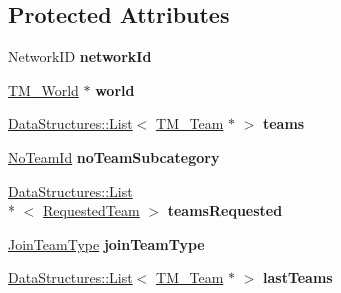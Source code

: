 \subsection*{Protected Attributes}
\begin{DoxyCompactItemize}
\item 
\hypertarget{class_rak_net_1_1_t_m___team_member_a7d1c66beeee534cbcfd6b041eaf6142e}{Network\-I\-D {\bfseries network\-Id}}\label{class_rak_net_1_1_t_m___team_member_a7d1c66beeee534cbcfd6b041eaf6142e}

\item 
\hypertarget{class_rak_net_1_1_t_m___team_member_a3e7be6d9b97a79a9a93cd23332a9604d}{\hyperlink{class_rak_net_1_1_t_m___world}{T\-M\-\_\-\-World} $\ast$ {\bfseries world}}\label{class_rak_net_1_1_t_m___team_member_a3e7be6d9b97a79a9a93cd23332a9604d}

\item 
\hypertarget{class_rak_net_1_1_t_m___team_member_a1578302b4ff5ebb3f23f3283be8cecd7}{\hyperlink{class_data_structures_1_1_list}{Data\-Structures\-::\-List}$<$ \hyperlink{class_rak_net_1_1_t_m___team}{T\-M\-\_\-\-Team} $\ast$ $>$ {\bfseries teams}}\label{class_rak_net_1_1_t_m___team_member_a1578302b4ff5ebb3f23f3283be8cecd7}

\item 
\hypertarget{class_rak_net_1_1_t_m___team_member_a95a2a078cbf25ade7e18a4b9a4ce5e4e}{\hyperlink{group___t_e_a_m___m_a_n_a_g_e_r___g_r_o_u_p_gadd1e99b7724ceb0f6794f46de31a6b02}{No\-Team\-Id} {\bfseries no\-Team\-Subcategory}}\label{class_rak_net_1_1_t_m___team_member_a95a2a078cbf25ade7e18a4b9a4ce5e4e}

\item 
\hypertarget{class_rak_net_1_1_t_m___team_member_a88d6dd77ce0ba424ed755334476f573c}{\hyperlink{class_data_structures_1_1_list}{Data\-Structures\-::\-List}\\*
$<$ \hyperlink{struct_rak_net_1_1_t_m___team_member_1_1_requested_team}{Requested\-Team} $>$ {\bfseries teams\-Requested}}\label{class_rak_net_1_1_t_m___team_member_a88d6dd77ce0ba424ed755334476f573c}

\item 
\hypertarget{class_rak_net_1_1_t_m___team_member_a35234f8942bfc35bbc2ddae6df7adfb3}{\hyperlink{group___t_e_a_m___m_a_n_a_g_e_r___g_r_o_u_p_ga8a8704b992ae17ee4789b2ba4cc4b34b}{Join\-Team\-Type} {\bfseries join\-Team\-Type}}\label{class_rak_net_1_1_t_m___team_member_a35234f8942bfc35bbc2ddae6df7adfb3}

\item 
\hypertarget{class_rak_net_1_1_t_m___team_member_a415aa8ee2c3dc5809abc830dd81eb718}{\hyperlink{class_data_structures_1_1_list}{Data\-Structures\-::\-List}$<$ \hyperlink{class_rak_net_1_1_t_m___team}{T\-M\-\_\-\-Team} $\ast$ $>$ {\bfseries last\-Teams}}\label{class_rak_net_1_1_t_m___team_member_a415aa8ee2c3dc5809abc830dd81eb718}


\end{DoxyCompactItemize}
